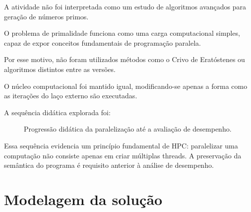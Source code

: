 A atividade não foi interpretada como um estudo de algoritmos avançados
para geração de números primos.

O problema de primalidade funciona como uma carga computacional simples,
capaz de expor conceitos fundamentais de programação paralela.

Por esse motivo, não foram utilizados métodos como o Crivo de Eratóstenes
ou algoritmos distintos entre as versões.

O núcleo computacional foi mantido igual, modificando-se apenas a forma
como as iterações do laço externo são executadas.

A sequência didática explorada foi:

\begin{figure}[htbp]
    \centering
    \caption{Progressão didática da paralelização até a avaliação de desempenho.}
    \label{fig:atvd05-percurso-didatico}
\end{figure}

Essa sequência evidencia um princípio fundamental de HPC: paralelizar uma
computação não consiste apenas em criar múltiplas threads. A preservação da
semântica do programa é requisito anterior à análise de desempenho.


\section{Modelagem da solução}
\label{sec:atvd05-modelagem}

